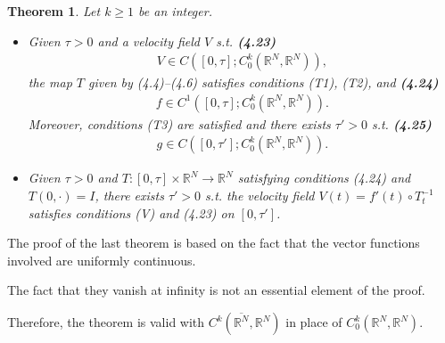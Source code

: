 \documentclass{book}
\numberwithin{equation}{section}
\newtheorem{theorem}{Theorem}[section]
\begin{document}
\begin{enumerate}
    \begin{theorem}
        Let $k\ge 1$ be an integer.
        \begin{itemize}
            \item[(i)] Given $\tau > 0$ and a velocity field $V$ s.t. \textbf{(4.23)}
            \begin{align*}
                V\in C([0,\tau];C_0^k(\mathbb{R}^N,\mathbb{R}^N)),
            \end{align*}
            the map $T$ given by (4.4)–(4.6) satisfies conditions (T1), (T2), and \textbf{(4.24)}
            \begin{align*}
                f\in C^1([0,\tau];C_0^k(\mathbb{R}^N,\mathbb{R}^N)).
            \end{align*}
            Moreover, conditions (T3) are satisfied and there exists $\tau' > 0$ s.t. \textbf{(4.25)}
            \begin{align*}
                g\in C([0,\tau'];C_0^k(\mathbb{R}^N,\mathbb{R}^N)).
            \end{align*}
            \item[(ii)] Given $\tau > 0$ and $T:[0,\tau]\times\mathbb{R}^N\to\mathbb{R}^N$ satisfying conditions (4.24) and $T(0,\cdot) = I$, there exists $\tau' > 0$ s.t. the velocity field $V(t) = f'(t)\circ T_t^{-1}$ satisfies conditions (V) and (4.23) on $[0,\tau']$.
        \end{itemize}
    \end{theorem}
    The proof of the last theorem is based on the fact that the vector functions involved are uniformly continuous.
    
    The fact that they vanish at infinity is not an essential element of the proof.
    
    Therefore, the theorem is valid with $C^k(\overline{\mathbb{R}^N},\mathbb{R}^N)$ in place of $C_0^k(\mathbb{R}^N,\mathbb{R}^N)$.
    

\end{enumerate}
\end{document}
